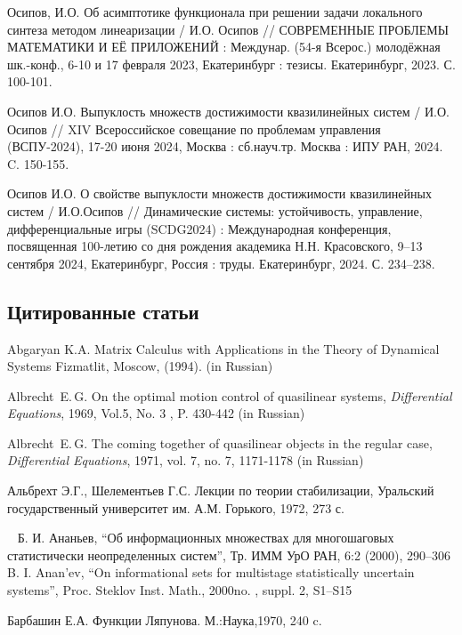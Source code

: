\documentclass[../main.tex]{subfiles}
\begin{document}
\begin{thebibliography}{99}
    Осипов, И.О. Об асимптотике функционала при решении задачи локального синтеза методом линеаризации / И.О. Осипов // СОВРЕМЕННЫЕ ПРОБЛЕМЫ МАТЕМАТИКИ И ЕЁ ПРИЛОЖЕНИЙ : Междунар. (54-я Всерос.) молодёжная шк.-конф., 6-10 и 17 февраля 2023, Екатеринбург : тезисы. Екатеринбург, 2023. С. 100-101. 
    
    Осипов И.О. Выпуклость множеств достижимости квазилинейных систем / И.О. Осипов // XIV Всероссийское совещание по проблемам управления (ВСПУ-2024), 17-20 июня 2024, Москва : сб.науч.тр. Москва : ИПУ РАН, 2024. C. 150-155.  
    
    Осипов И.О. О свойстве выпуклости множеств достижимости квазилинейных систем / И.О.Осипов // Динамические системы: устойчивость, управление, дифференциальные игры (SCDG2024) : Международная конференция, посвященная 100-летию со дня рождения академика Н.Н. Красовского, 9–13 сентября 2024, Екатеринбург, Россия : труды. Екатеринбург, 2024. С. 234–238.  


\subsection*{Цитированные статьи}

Abgaryan K.A. Matrix Calculus with Applications in the Theory of Dynamical Systems Fizmatlit, Moscow, (1994). (in Russian)

Albrecht~E.\,G. On the optimal motion control of quasilinear systems, \emph{Differential Equations}, 1969, Vol.5, No. 3 , P. 430-442 (in Russian)

Albrecht~E.\,G. The coming together of quasilinear objects in the regular case, \emph{Differential Equations}, 1971, vol. 7, no. 7, 1171-1178 (in Russian)

Альбрехт Э.Г., Шелементьев Г.С. Лекции по теории стабилизации, Уральский государственный университет им. А.М. Горького, 1972, 273 с.

Б. И. Ананьев, “Об информационных множествах для многошаговых статистически неопределенных систем”, Тр. ИММ УрО РАН, 6:2 (2000),  290–306  B. I. Anan'ev, “On informational sets for multistage statistically uncertain systems”, Proc. Steklov Inst. Math., 2000no. , suppl. 2, S1–S15


Барбашин Е.А. Функции Ляпунова. М.:Наука,1970, 240 c.


\end{thebibliography}
\end{document}
